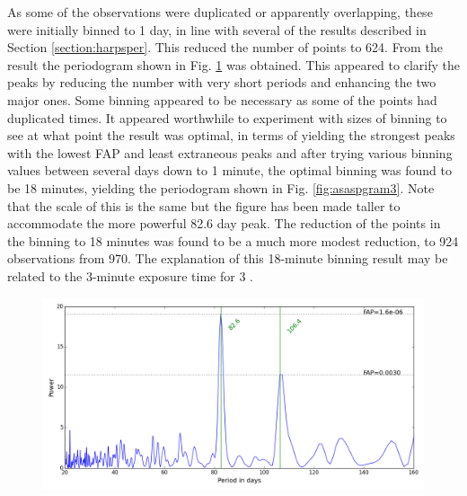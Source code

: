 
As some of the observations were duplicated or apparently overlapping, these were initially binned to 1 day, in line
with several of the {\harps} results described in Section \ref{section:harpsper}. This reduced the number of points to
624. From the result the periodogram shown in Fig. \ref{fig:asaspgram2} was obtained. This appeared to clarify the peaks
by reducing the number with very short periods and enhancing the two major ones. Some binning appeared to be necessary
as some of the points had duplicated times. It appeared worthwhile to experiment with sizes of binning to see at what
point the result was optimal, in terms of yielding the strongest peaks with the lowest FAP and least extraneous peaks
and after trying various binning values between several days down to 1 minute, the optimal binning was found to be 18
minutes, yielding the periodogram shown in Fig. \ref{fig:asaspgram3}. Note that the scale of this is the same but the
figure has been made taller to accommodate the more powerful 82.6 day peak. The reduction of the points in the binning
to 18 minutes was found to be a much more modest reduction, to 924 observations from 970. The explanation of this
18-minute binning result may be related to the 3-minute exposure time for {\asas} 3 \citep{pojmanski01}.

\begin{figure}[!htbp]
\begin{center}
\includegraphics[scale=0.50]{Figures/asasbin1.png} \\
\end{center}
\caption{}
\protect\label{fig:asaspgram2}
\end{figure}

